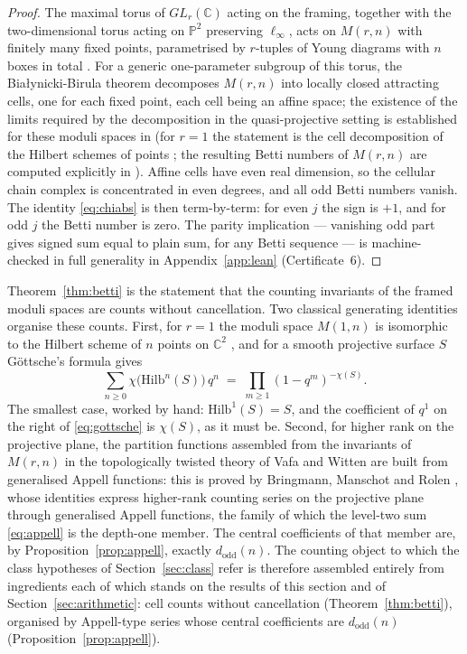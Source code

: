 \documentclass[11pt,a4paper]{article}
\newcommand{\C}{\mathbb{C}}
\newcommand{\PP}{\mathbb{P}}
\newcommand{\dodd}{d_{\mathrm{odd}}}
\newcommand{\Hilb}{\mathrm{Hilb}}
\newcommand{\Mod}{M}
\theoremstyle{plain}
\theoremstyle{definition}
\theoremstyle{remark}
\begin{document}
\begin{proof}
The maximal torus of $GL_r(\C)$ acting on the framing, together with
the two-dimensional torus acting on $\PP^2$ preserving
$\ell_\infty$, acts on $\Mod(r,n)$ with finitely many fixed points,
parametrised by $r$-tuples of Young diagrams with $n$ boxes in total
\cite{NakajimaYoshioka}. For a generic one-parameter subgroup of this
torus, the Bia{\l}ynicki-Birula theorem \cite{BB} decomposes
$\Mod(r,n)$ into locally closed attracting cells, one for each fixed
point, each cell being an affine space; the existence of the limits
required by the decomposition in the quasi-projective setting is
established for these moduli spaces in \cite{NakajimaYoshioka} (for
$r = 1$ the statement is the cell decomposition of the Hilbert
schemes of points \cite{NakajimaLectures}; the resulting Betti
numbers of $\Mod(r,n)$ are computed explicitly in
\cite{NYlectures}). Affine cells have even
real dimension, so the cellular chain complex is concentrated in even
degrees, and all odd Betti numbers vanish. The identity
\eqref{eq:chiabs} is then term-by-term: for even $j$ the sign is
$+1$, and for odd $j$ the Betti number is zero. The parity
implication --- vanishing odd part gives signed sum equal to plain
sum, for any Betti sequence --- is machine-checked in full generality
in Appendix~\ref{app:lean} (Certificate~6).
\end{proof}

Theorem~\ref{thm:betti} is the statement that the counting invariants
of the framed moduli spaces are counts without cancellation. Two classical
generating identities organise these counts. First, for $r = 1$ the
moduli space $\Mod(1,n)$ is isomorphic to the Hilbert scheme of $n$
points on $\C^2$ \cite{NakajimaLectures}, and for a smooth projective
surface $S$ G\"ottsche's formula \cite{Gottsche} gives
\begin{equation}\label{eq:gottsche}
  \sum_{n \ge 0} \chi\bigl(\Hilb^n(S)\bigr)\, q^n
  \;=\; \prod_{m \ge 1} (1 - q^m)^{-\chi(S)} .
\end{equation}
The smallest case, worked by hand: $\Hilb^1(S) = S$, and the
coefficient of $q^1$ on the right of \eqref{eq:gottsche} is
$\chi(S)$, as it must be. Second, for higher rank on the projective
plane, the partition functions assembled from the invariants of
$\Mod(r,n)$ in the topologically twisted theory of Vafa and Witten
\cite{VafaWitten} are built from generalised Appell functions: this
is proved by Bringmann, Manschot and Rolen \cite{BMR}, whose
identities express higher-rank counting series on the projective
plane through generalised Appell functions, the family of which the
level-two sum \eqref{eq:appell} is the depth-one member. The central coefficients
of that member are, by Proposition~\ref{prop:appell}, exactly
$\dodd(n)$. The counting object to which the class hypotheses of
Section~\ref{sec:class} refer is therefore assembled entirely from
ingredients each of which stands on the results of this section and
of Section~\ref{sec:arithmetic}: cell counts without cancellation
(Theorem~\ref{thm:betti}), organised by Appell-type series whose
central coefficients are $\dodd(n)$
(Proposition~\ref{prop:appell}).
\end{document}
